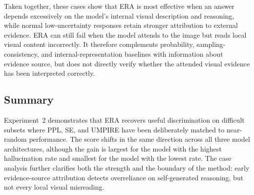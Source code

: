 \FloatBarrier

Taken together, these cases show that ERA is most effective when an answer depends excessively on the model's internal visual description and reasoning, while normal low-uncertainty responses retain stronger attribution to external evidence. ERA can still fail when the model attends to the image but reads local visual content incorrectly. It therefore complements probability, sampling-consistency, and internal-representation baselines with information about evidence source, but does not directly verify whether the attended visual evidence has been interpreted correctly.

\subsection{Summary}

Experiment~2 demonstrates that ERA recovers useful discrimination on difficult subsets where PPL, SE, and UMPIRE have been deliberately matched to near-random performance. The score shifts in the same direction across all three model architectures, although the gain is largest for the model with the highest hallucination rate and smallest for the model with the lowest rate. The case analysis further clarifies both the strength and the boundary of the method: early evidence-source attribution detects overreliance on self-generated reasoning, but not every local visual misreading.
